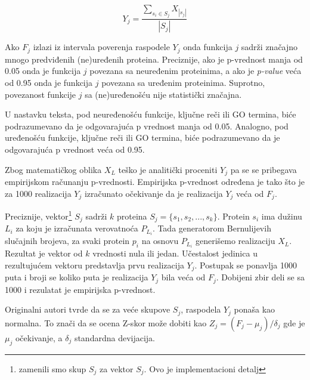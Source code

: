 $$ Y_j = \dfrac {\sum_{s_i \in S_j} {X_{|s_j|}}}{|S_j|}$$

Ako $F_j$ izlazi iz intervala poverenja raspodele $Y_j$ onda funkcija $j$
sadrži značajno mnogo predviđenih (ne)uređenih proteina. Preciznije,
ako je p-vrednost  manja od 0.05 onda je funkcija $j$ povezana sa neuređenim
proteinima, a ako je \textit{p-value} veća od 0.95 onda je funkcija $j$ povezana sa
uređenim proteinima.  Suprotno, povezanost funkcije $j$ sa (ne)uređenošću nije
statistički značajna.  

U nastavku teksta, pod neuređenošću funkcije, ključne reči ili GO termina, biće
podrazumevano da je odgovarajuća p vrednost manja od 0.05. Analogno, pod
uređenošću funkcije, ključne reči ili GO termina, biće podrazumevano da je
odgovarajuća p vrednost veća od 0.95.

Zbog matematičkog oblika $X_L$ teško je analitički proceniti $Y_j$ pa se se
pribegava empirijskom računanju p-vrednosti. Empirijska p-vrednost određena je
tako što je za 1000 realizacija $Y_j$ izračunato očekivanje da je realizacija
$Y_j$ veća od $F_j$.

Preciznije, vektor\footnote{zamenili smo skup $S_j$ za vektor $S_j$. Ovo je
implementacioni detalj} $S_j$ sadrži $k$ proteina $S_j=\{s_1, s_2, ...
,s_{k}\}$.  Protein $s_i$ ima dužinu $L_i$ za koju je izračunata verovatnoća
$P_{L_i}$.  Tada generatorom Bernulijevih slučajnih brojeva, za svaki protein
$p_i$ na osnovu $P_{L_i}$ generišemo realizaciju $X_L$. Rezultat je vektor od
$k$ vrednosti nula ili jedan. Učestalost jedinica u rezultujućem vektoru
predstavlja prvu realizacija $Y_j$.  Postupak se ponavlja 1000 puta i broji
se koliko puta je realizacija $Y_j$ bila veća od $F_j$. Dobijeni zbir deli se
sa 1000 i rezulatat je empirijska p-vrednost.


Originalni autori tvrde da se za veće skupove $S_j$, raspodela
$Y_j$ ponaša kao normalna. To znači da se ocena Z-skor može dobiti kao
$Z_j=(F_j-\mu_j)/\delta_j$ gde je $\mu_j$ očekivanje, a $\delta_j$ standardna
devijacija. 


